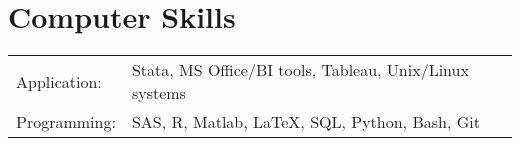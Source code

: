 \documentclass[letterpaper]{article}
\begin{document}
\section*{Computer Skills}
\begin{tabular}{ll}
 Application: & Stata, MS Office/BI tools, Tableau, Unix/Linux systems \\
 Programming: & SAS, R, Matlab, \LaTeX, SQL, Python, Bash, Git\\
\end{tabular}



\end{document}

